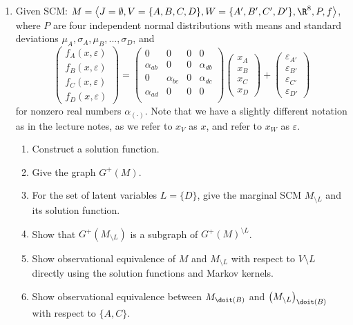\begin{enumerate}[label=10.\arabic*]
    \item %
    Given SCM: $M = \left\langle J=\emptyset, V=\{A, B, C, D\}, W=\{A', B', C', D'\}, \R^8, P, f \right\rangle$, where $P$ are four independent normal distributions with means and standard deviations $\mu_A, \sigma_A, \mu_B, ..., \sigma_D$, and
    \[
        \begin{pmatrix}
            f_A(x, \varepsilon) \\ f_B(x, \varepsilon) \\ f_C(x, \varepsilon) \\ f_D(x, \varepsilon)
        \end{pmatrix}
        =
        \begin{pmatrix}
            0           & 0           & 0 & 0           \\
            \alpha_{ab} & 0           & 0 & \alpha_{db} \\
            0           & \alpha_{bc} & 0 & \alpha_{dc} \\
            \alpha_{ad} & 0           & 0 & 0           \\
        \end{pmatrix}
        \begin{pmatrix}
            x_A \\ x_B \\ x_C \\ x_D
        \end{pmatrix}
        +
        \begin{pmatrix}
            \varepsilon_{A'} \\ \varepsilon_{B'} \\ \varepsilon_{C'} \\ \varepsilon_{D'}
        \end{pmatrix}
    \]
    for nonzero real numbers $\alpha_{(\cdot)}$. Note that we have a slightly different notation as in the lecture notes, as we refer to $x_V$ as $x$, and refer to $x_W$ as $\varepsilon$.
    \begin{enumerate}
        \item Construct a solution function.
        \item Give the graph $G^+(M)$.
        \item For the set of latent variables $L=\{D\}$, give the marginal SCM $M_{\setminus L}$ and its solution function.
        \item Show that $G^+(M_{\setminus L})$ is a subgraph of $G^+(M)^{\setminus L}$.
        \item Show observational equivalence of $M$ and $M_{\setminus L}$ with respect to $V \setminus L$ directly using the solution functions and Markov kernels.
        \item Show observational equivalence between $M_{\doit(B)}$ and ${\left(M_{\setminus L}\right)}_{\doit(B)}$ with respect to $\{A,C\}$.
    \end{enumerate}


\end{enumerate}
